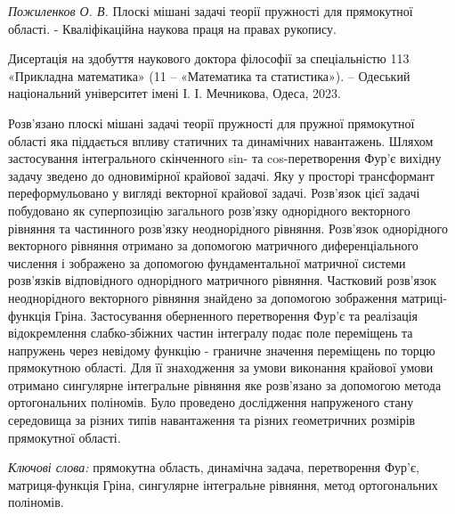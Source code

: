 \textit{Пожиленков О. В.}
Плоскі мішані задачі теорії пружності для прямокутної області. - Кваліфікаційна наукова праця на правах рукопису.

Дисертація на здобуття наукового доктора філософії за спеціальністю 113 «Прикладна математика» (11 – «Математика та статистика»). – Одеський національний університет імені І. І. Мечникова, Одеса, 2023.

Розв'язано плоскі мішані задачі теорії пружності для пружної прямокутної області яка піддається впливу статичних та динамічних навантажень.
Шляхом застосування інтегрального скінченного sin- та cos-перетворення Фур'є вихідну задачу зведено до одновимірної крайової задачі.
Яку у просторі трансформант переформульовано у вигляді векторної крайової задачі.
Розв'язок цієї задачі побудовано як суперпозицію загального розв'язку однорідного векторного рівняння та частинного розв'язку неоднорідного рівняння.
Розв'язок однорідного векторного рівняння отримано за допомогою матричного диференціального числення і зображено за допомогою фундаментальної матричної системи розв'язків відповідного однорідного матричного рівняння.
Частковий розв'язок неоднорідного векторного рівняння знайдено за допомогою зображення матриці-функція Гріна.
Застосування оберненного перетворення Фур'є та реалізація відокремлення слабко-збіжних частин інтегралу подає поле переміщень та напружень через невідому функцію - граничне значення переміщень по торцю прямокутною області.
Для її знаходження за умови виконання крайової умови отримано сингулярне інтегральне рівняння яке розв'язано за допомогою метода ортогональних поліномів.
Було проведено дослідження напруженого стану середовища за різних типів навантаження та різних геометричних розмірів прямокутної області.

\textit{Ключові слова:}
прямокутна область, динамічна задача, перетворення Фур’є, матриця-функція Гріна, сингулярне інтегральне рівняння, метод ортогональних поліномів.
